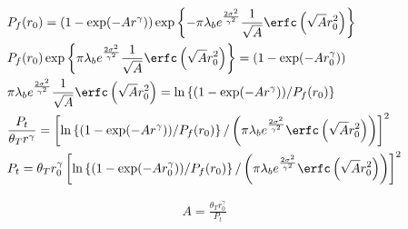 \begin{align}
	& P_{f}(r_{0}) = ( 1- \exp( -Ar^{\gamma}) )
	\exp\left\lbrace -\pi \lambda_{b} e^{\frac{2\sigma^2}{\gamma^2}}  \frac{1}{\sqrt{A}} \erfc\left( \sqrt{A} r_0^2 \right)   \right\rbrace \\
	& P_{f}(r_{0}) \exp\left\lbrace \pi \lambda_{b} e^{\frac{2\sigma^2}{\gamma^2}}  \frac{1}{\sqrt{A}} \erfc\left( \sqrt{A} r_0^2 \right)   \right\rbrace = ( 1- \exp( -Ar_0^{\gamma}) ) \\
	& \pi \lambda_{b} e^{\frac{2\sigma^2}{\gamma^2}}  \frac{1}{\sqrt{A}} \erfc\left( \sqrt{A} r_0^2 \right) = \ln\left\lbrace  ( 1- \exp( -Ar^{\gamma}) ) / P_{f}(r_{0}) \right\rbrace \\
	& \frac{P_{t}}{\theta_{T} r^{\gamma}}  = \left[ \ln\left\lbrace  ( 1- \exp( -Ar^{\gamma}) ) / P_{f}(r_{0}) \right\rbrace /  \left( \pi \lambda_{b} e^{\frac{2\sigma^2}{\gamma^2}}   \erfc\left( \sqrt{A} r_0^2 \right) \right) \right]  ^ 2 \\
	& P_t =  \theta_{T} r_0^{\gamma} \left[ \ln\left\lbrace  ( 1- \exp( -Ar_0^{\gamma}) ) / P_{f}(r_{0}) \right\rbrace /  \left( \pi \lambda_{b} e^{\frac{2\sigma^2}{\gamma^2}}   \erfc\left( \sqrt{A} r_0^2 \right) \right) \right]  ^ 2
\end{align}


\begin{align}
	A  = \frac{\theta_{T} r_0^{\gamma}}{P_t}
\end{align}
